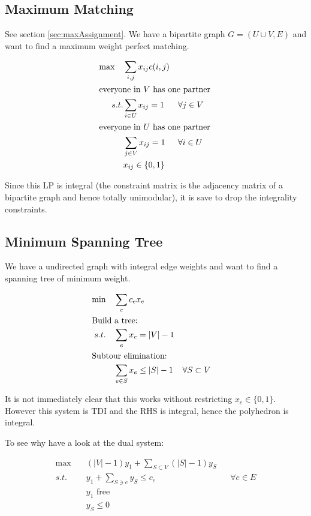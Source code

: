 \subsection{Maximum Matching}

See section \ref{sec:maxAssignment}. We have a bipartite graph $G=(U\cup V,E)$ and want to find a maximum weight perfect matching.

\begin{align*}
\max \quad &  \sum_{i,j} x_{ij} c(i,j)\\
\intertext{everyone in $V$ has one partner}
s.t. & \sum_{i\in U} x_{ij}=1 && \forall j\in V \\
\intertext{everyone in $U$ has one partner}
&\sum_{j\in V} x_{ij} = 1 && \forall i\in U\\
&x_{ij}\in \{0,1\}
\end{align*}

Since this LP is integral (the constraint matrix is the adjacency matrix of a bipartite graph and hence totally unimodular), it is save to drop the integrality constraints.

\subsection{Minimum Spanning Tree}

We have a undirected graph with integral edge weights and want to find a spanning tree of minimum weight.

\begin{align*}
\min \quad &\sum_e c_e x_e\\
\intertext{Build a tree:}
s.t. \quad & \sum_e x_e = |V| -1 \\
\intertext{Subtour elimination:}
	& \sum_{e\in S} x_e \leq |S| -1 && \forall S \subset V
\end{align*}

It is not immediately clear that this works without restricting $x_e\in \{0,1\}$. However this system is TDI and the RHS is integral, hence the polyhedron is integral.

To see why have a look at the dual system:

\begin{align*}
\max \quad & (|V|-1)y_1 + \sum_{S\subset V} (|S|-1)y_S\\
s.t. \quad & y_1 + \sum_{S\ni e} y_S \leq c_e && \forall e\in E\\ 
	& y_1 \text{ free}\\
	& y_S \leq 0
\end{align*}

